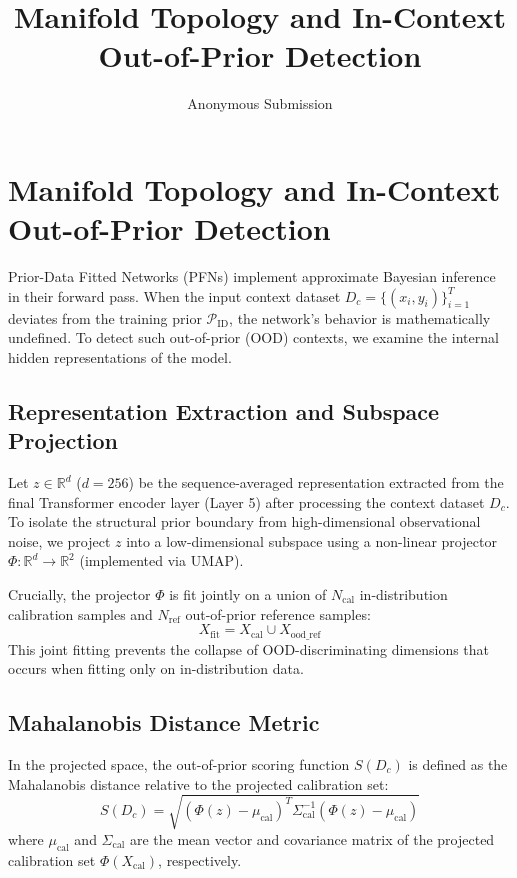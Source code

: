 \documentclass[letterpaper]{article}
\title{Manifold Topology and In-Context Out-of-Prior Detection}
\author{Anonymous Submission}
\begin{document}
\maketitle

\section{Manifold Topology and In-Context Out-of-Prior Detection}

Prior-Data Fitted Networks (PFNs) implement approximate Bayesian inference in their forward pass. When the input context dataset $D_c = \{(x_i, y_i)\}_{i=1}^T$ deviates from the training prior $\mathcal{P}_{\text{ID}}$, the network's behavior is mathematically undefined. To detect such out-of-prior (OOD) contexts, we examine the internal hidden representations of the model.

\subsection{Representation Extraction and Subspace Projection}
Let $z \in \mathbb{R}^d$ ($d=256$) be the sequence-averaged representation extracted from the final Transformer encoder layer (Layer 5) after processing the context dataset $D_c$. To isolate the structural prior boundary from high-dimensional observational noise, we project $z$ into a low-dimensional subspace using a non-linear projector $\Phi: \mathbb{R}^d \to \mathbb{R}^2$ (implemented via UMAP).

Crucially, the projector $\Phi$ is fit jointly on a union of $N_{\text{cal}}$ in-distribution calibration samples and $N_{\text{ref}}$ out-of-prior reference samples:
\begin{equation}
X_{\text{fit}} = X_{\text{cal}} \cup X_{\text{ood\_ref}}
\end{equation}
This joint fitting prevents the collapse of OOD-discriminating dimensions that occurs when fitting only on in-distribution data.

\subsection{Mahalanobis Distance Metric}
In the projected space, the out-of-prior scoring function $S(D_c)$ is defined as the Mahalanobis distance relative to the projected calibration set:
\begin{equation}
S(D_c) = \sqrt{(\Phi(z) - \mu_{\text{cal}})^T \Sigma_{\text{cal}}^{-1} (\Phi(z) - \mu_{\text{cal}})}
\end{equation}
where $\mu_{\text{cal}}$ and $\Sigma_{\text{cal}}$ are the mean vector and covariance matrix of the projected calibration set $\Phi(X_{\text{cal}})$, respectively.
\end{document}
